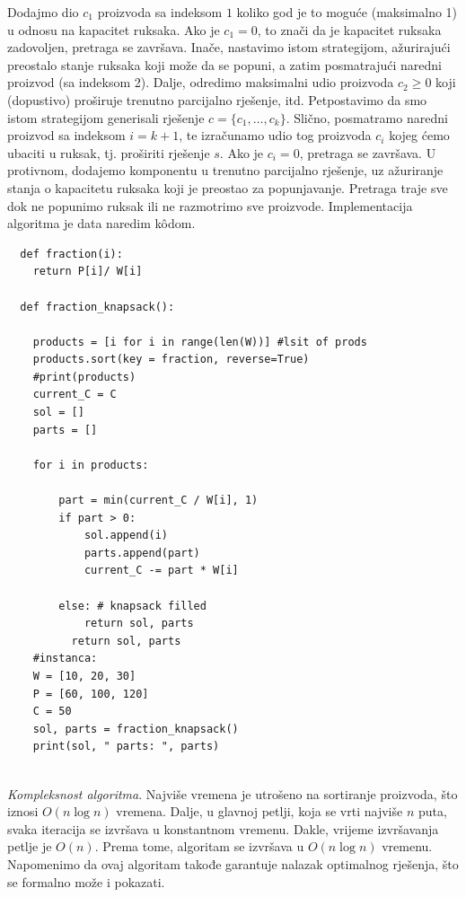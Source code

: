 \begin{solution}
    
    Dodajmo dio $c_1$ proizvoda sa indeksom $1$ koliko god je to moguće (maksi\-malno 1) u odnosu na kapacitet ruksaka. Ako je  $c_1 = 0$, to znači da je kapacitet ruksaka zadovoljen, pretraga se završava. Inače, nastavimo istom strategijom, ažurirajući preostalo stanje ruksaka koji može da se popuni, a zatim posmatrajući naredni proizvod (sa indeksom 2). Dalje, odredimo maksimalni udio proizvoda $c_2\geq 0$ koji  (dopustivo) proširuje trenutno  parcija\-lno rješenje, itd. Petpostavimo da smo istom strategijom generisali rješenje $c = \{ c_{1}, \ldots, c_{k}\}$. %
     Slično, posmatramo naredni proizvod sa indeksom $i =  k+1$, te izračunamo udio tog proizvoda $c_{i}$ kojeg ćemo ubaciti u ruksak, tj. proširiti rješenje $s$. Ako je $c_i = 0$, pretraga se završava. U protivnom, dodajemo komponentu u trenutno parcijalno rješenje, uz ažuriranje stanja o kapacitetu ruksaka koji je preostao za popunjavanje. Pretraga traje sve dok ne popunimo ruksak ili ne razmotrimo sve proizvode.    Implementacija algoritma je data naredim k\^odom. 
   
   \begin{verbatim}
  def fraction(i):
  	return P[i]/ W[i]
  
  def fraction_knapsack():
  
  	products = [i for i in range(len(W))] #lsit of prods
  	products.sort(key = fraction, reverse=True)
  	#print(products)
  	current_C = C
  	sol = []
  	parts = []
  
  	for i in products:
  
  		part = min(current_C / W[i], 1)
  		if part > 0:
  			sol.append(i)
  			parts.append(part)
  			current_C -= part * W[i]
  
  		else: # knapsack filled
  			return sol, parts
          return sol, parts
    #instanca: 
    W = [10, 20, 30]
    P = [60, 100, 120]
    C = 50
    sol, parts = fraction_knapsack()
    print(sol, " parts: ", parts)
  
   \end{verbatim}

\textit{Kompleksnost algoritma}.  Najviše vremena je utrošeno na sortiranje proi\-zvoda, što iznosi $O(n \log n)$ vremena. Dalje, u glavnoj petlji, koja se vrti najviše $n$ puta,  svaka iteracija se izvršava u konstantnom vremenu. Dakle, vrijeme izvršavanja petlje je $O(n)$. Prema tome, algoritam se izvršava u $O(n \log n)$ vremenu. Napomenimo da ovaj algoritam takođe garantuje nalazak optimalnog rješenja, što se formalno može i pokazati. 
\end{solution}


